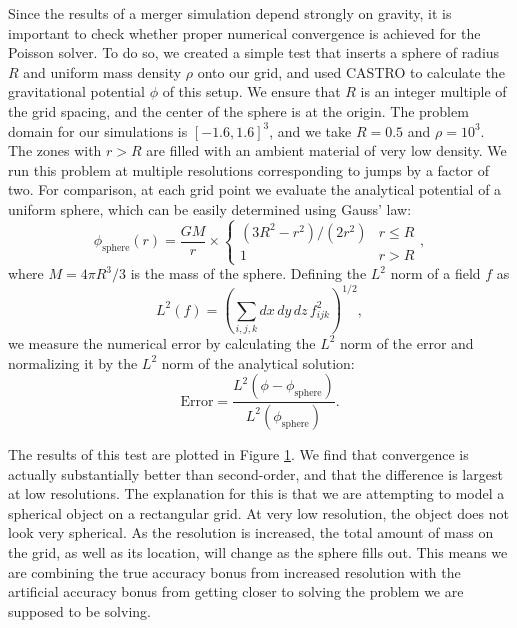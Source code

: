 \documentclass[12pt,preprint]{aastex}
\begin{document}
Since the results of a merger simulation depend strongly on gravity, it is important to check whether proper numerical convergence is achieved for the Poisson solver. To do so, we created a simple test that inserts a sphere of radius $R$ and uniform mass density $\rho$ onto our grid, and used CASTRO to calculate the gravitational potential $\phi$ of this setup. We ensure that $R$ is an integer multiple of the grid spacing, and the center of the sphere is at the origin. The problem domain for our simulations is $[-1.6, 1.6]^3$, and we take $R = 0.5$ and $\rho = 10^3$. The zones with $r > R$ are filled with an ambient material of very low density. We run this problem at multiple resolutions corresponding to jumps by a factor of two. For comparison, at each grid point we evaluate the analytical potential of a uniform sphere, which can be easily determined using Gauss' law:
\begin{equation}
  \phi_{\text{sphere}}(r) = \frac{GM}{r} \times \begin{cases} (3R^2 - r^2)/(2 r^2) & r \leq R \\ 1 & r > R \end{cases},\label{eq:sphere-analytical}
\end{equation}
where $M = 4\pi R^3 / 3$ is the mass of the sphere. Defining the $L^2$ norm of a field $f$ as
\begin{equation}
  L^2(f) = \left(\sum_{i,j,k} dx\, dy\, dz\, f_{ijk}^2\right)^{1/2},
\end{equation}
we measure the numerical error by calculating the $L^2$ norm of the error and normalizing it by the $L^2$ norm of the analytical solution:
\begin{equation}
  \text{Error} = \frac{L^2(\phi - \phi_{\text{sphere}})}{L^2(\phi_{\text{sphere}})}.
\end{equation}

\begin{figure}
  \label{fig:gravity_convergence}
\end{figure}

The results of this test are plotted in Figure \ref{fig:gravity_convergence}. We find that convergence is actually substantially better than second-order, and that the difference is largest at low resolutions. The explanation for this is that we are attempting to model a spherical object on a rectangular grid. At very low resolution, the object does not look very spherical. As the resolution is increased, the total amount of mass on the grid, as well as its location, will change as the sphere fills out. This means we are combining the true accuracy bonus from increased resolution with the artificial accuracy bonus from getting closer to solving the problem we are supposed to be solving.
\end{document}
